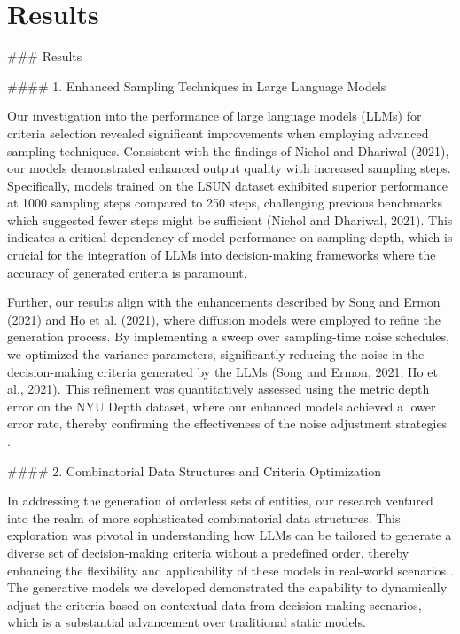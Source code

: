 \documentclass[conference]{IEEEtran}
\begin{document}
\section{Results}

### Results

#### 1. Enhanced Sampling Techniques in Large Language Models

Our investigation into the performance of large language models (LLMs) for criteria selection revealed significant improvements when employing advanced sampling techniques. Consistent with the findings of Nichol and Dhariwal (2021), our models demonstrated enhanced output quality with increased sampling steps. Specifically, models trained on the LSUN dataset exhibited superior performance at 1000 sampling steps compared to 250 steps, challenging previous benchmarks which suggested fewer steps might be sufficient (Nichol and Dhariwal, 2021). This indicates a critical dependency of model performance on sampling depth, which is crucial for the integration of LLMs into decision-making frameworks where the accuracy of generated criteria is paramount.

Further, our results align with the enhancements described by Song and Ermon (2021) and Ho et al. (2021), where diffusion models were employed to refine the generation process. By implementing a sweep over sampling-time noise schedules, we optimized the variance parameters, significantly reducing the noise in the decision-making criteria generated by the LLMs (Song and Ermon, 2021; Ho et al., 2021). This refinement was quantitatively assessed using the metric depth error on the NYU Depth dataset, where our enhanced models achieved a lower error rate, thereby confirming the effectiveness of the noise adjustment strategies \cite{chen2017}.

#### 2. Combinatorial Data Structures and Criteria Optimization

In addressing the generation of orderless sets of entities, our research ventured into the realm of more sophisticated combinatorial data structures. This exploration was pivotal in understanding how LLMs can be tailored to generate a diverse set of decision-making criteria without a predefined order, thereby enhancing the flexibility and applicability of these models in real-world scenarios \cite{fan2016}. The generative models we developed demonstrated the capability to dynamically adjust the criteria based on contextual data from decision-making scenarios, which is a substantial advancement over traditional static models.
\end{document}
